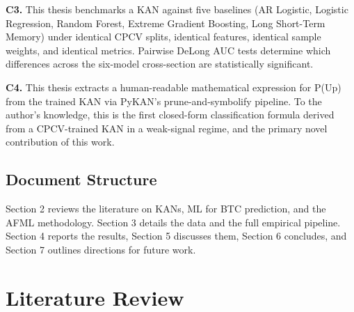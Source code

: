 \documentclass[12pt,a4paper,oneside]{article}
\begin{document}

\textbf{C3.} This thesis benchmarks a KAN against five baselines (AR Logistic, Logistic Regression, Random Forest, Extreme Gradient Boosting, Long Short-Term Memory) under identical CPCV splits, identical features, identical sample weights, and identical metrics. Pairwise DeLong AUC tests determine which differences across the six-model cross-section are statistically significant.


\textbf{C4.} This thesis extracts a human-readable mathematical expression for P(Up) from the trained KAN via PyKAN's prune-and-symbolify pipeline. To the author's knowledge, this is the first closed-form classification formula derived from a CPCV-trained KAN in a weak-signal regime, and the primary novel contribution of this work.


\subsection{Document Structure}\label{subsec:structure}

Section 2 reviews the literature on KANs, ML for BTC prediction, and the AFML methodology. Section 3 details the data and the full empirical pipeline. Section 4 reports the results, Section 5 discusses them, Section 6 concludes, and Section 7 outlines directions for future work.



\newpage
\section{Literature Review}\label{sec:literature}

%
\end{document}
